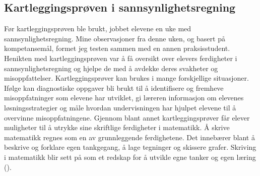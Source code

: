 \documentclass[main.tex]{subfiles}
\begin{document}
\subsection*{Kartleggingsprøven i sannsynlighetsregning}
Før kartleggingsprøven ble brukt, jobbet elevene en uke med sannsynlighetsregning. Mine observasjoner fra denne uken, 
og basert på kompetansemål, formet jeg testen sammen med en annen praksisstudent. Henikten med kartleggingsprøven 
var å få oversikt over elevers ferdigheter i sannsynlighetsregning og hjelpe de med å avdekke deres
svakheter og misoppfattelser. Kartleggingsprøver kan brukes i mange forskjellige situasjoner. 
Ifølge  kan diagnostiske oppgaver bli brukt til å identifisere og fremheve misoppfatninger 
som elevene har utviklet, gi læreren informasjon om elevenes løsningsstrategier og måle hvordan undervisningen 
har hjulpet elevene til å overvinne misoppfatningene. Gjennom blant annet kartleggingsprøver får elever muligheter
til å utrykke sine skriftlige ferdigheter i matematikk. Å skrive matematikk regnes som en av grunnleggende 
ferdighetene. Det innebærer blant å beskrive og forklare egen tankgegang, å lage tegninger og skissere grafer. 
Skriving i matematikk blir sett på som et redskap for å utvikle egne tanker og egen læring (). 
\end{document}
